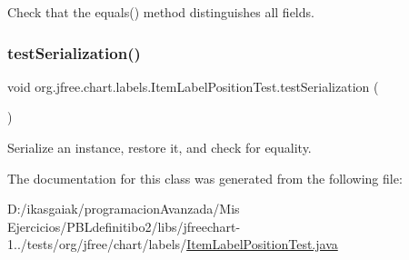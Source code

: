 Check that the equals() method distinguishes all fields. \mbox{\label{classorg_1_1jfree_1_1chart_1_1labels_1_1_item_label_position_test_a3c0308122763cd60c03585d6aff6970f}} 
\subsubsection{\texorpdfstring{test\+Serialization()}{testSerialization()}}
{\footnotesize\ttfamily void org.\+jfree.\+chart.\+labels.\+Item\+Label\+Position\+Test.\+test\+Serialization (\begin{DoxyParamCaption}{ }\end{DoxyParamCaption})}

Serialize an instance, restore it, and check for equality. 

The documentation for this class was generated from the following file\+:\begin{DoxyCompactItemize}
\item 
D\+:/ikasgaiak/programacion\+Avanzada/\+Mis Ejercicios/\+P\+B\+Ldefinitibo2/libs/jfreechart-\/1../tests/org/jfree/chart/labels/\mbox{\hyperlink{_item_label_position_test_8java}{Item\+Label\+Position\+Test.\+java}}\end{DoxyCompactItemize}
